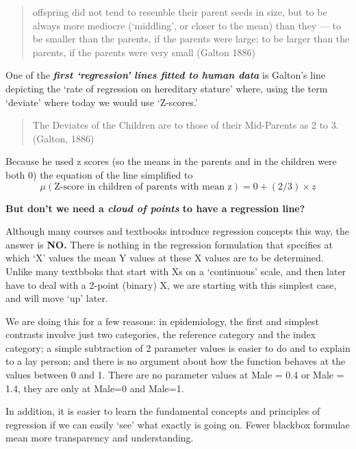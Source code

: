 \documentclass[]{book}
\begin{document}
\begin{quote}
offspring did not tend to resemble their parent seeds in size, but to be always more mediocre (`middling', or closer to the mean) than they --- to be smaller than the parents, if the parents were large; to be larger than the parents, if the parents were very small (Galton 1886)
\end{quote}

One of the \textbf{\emph{first `regression' lines fitted to human data}} is Galton's line depicting the `rate of regression on hereditary stature' where, using the term `deviate' where today we would use `Z-scores.'

\begin{quote}
The Deviates of the Children are to those of their Mid-Parents as 2 to 3. (Galton, 1886)
\end{quote}

Because he used z scores (so the means in the parents and in the children were both 0) the equation of the line simplified to \[\mu(\textrm{Z-score in children of parents with mean z}) = 0 + (2/3) \times z\]

\textbf{But don't we need a \emph{cloud of points} to have a regression line?}

Although many courses and textbooks introduce regression concepts this way, the answer is \textbf{NO.} There is nothing in the regression formulation that specifies at which `X' values the mean Y values at these X values are to be determined. Unlike many textbboks that start with Xs on a `continuous' scale, and then later have to deal with a 2-point (binary) X, we are starting with this simplest case, and will move `up' later.

We are doing this for a few reasons: in epidemiology, the first and simplest contrasts involve just two categories, the reference category and the index category; a simple subtraction of 2 parameter values is easier to do and to explain to a lay person; and there is no argument about how the function behaves at the values between 0 and 1. There are no parameter values at Male = 0.4 or Male = 1.4, they are only at Male=0 and Male=1.

In addition, it is easier to learn the fundamental concepts and principles of regression if we can easily `see' what exactly is going on. Fewer blackbox formulae mean more transparency and understanding.
\end{document}
